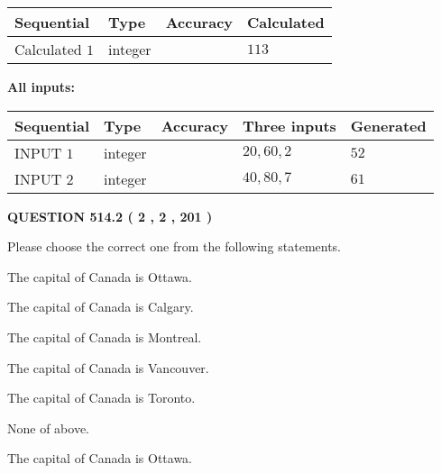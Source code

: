 \documentclass[12pt]{article}
\begin{document}
   
  
  
\noindent\begin{tabular}{|l|l|l|l|}
\hline
 Sequential & Type & Accuracy & Calculated \\ 
\hline
 
 
  Calculated $  1 $ & integer &  & 
  $ 113 $ 
 \\  \hline  
 \end{tabular}
   
   
   
   
\noindent\vspace{0.1in}\hspace{-0.08in} {\textbf{\Large{All inputs: }}}
   
   
  
  
\noindent\begin{tabular}{|l|l|l|l|l|}
\hline
 Sequential & Type & Accuracy & Three inputs & Generated \\ 
\hline
 
 
  INPUT $  1 $ & integer &  & $
 20
 , 
 60
 , 
 2
 $ & $ 52 $ 
 \\  \hline  
 
 
  INPUT $  2 $ & integer &  & $
 40
 , 
 80
 , 
 7
 $ & $ 61 $ 
 \\  \hline  
 \end{tabular}
   
   
  
\vspace{0.2in}
  
{\textbf{\Large{QUESTION
514.2 
 ( 2 , 2 , 201 )
}}}
  
  
Please choose the correct one from the following statements.
 
 
The capital of Canada is Ottawa.
 
 
The capital of Canada is Calgary.
 
 
The capital of Canada is Montreal.
 
 
The capital of Canada is Vancouver.
 
 
The capital of Canada is Toronto.
 
 
 None of above.
 
 
\noindent{}
 
 
The capital of Canada is Ottawa.
 
\end{document}
